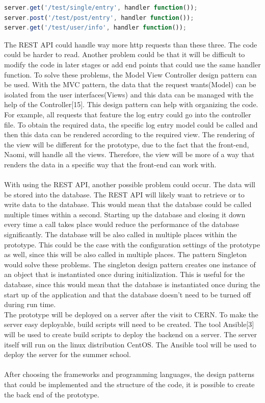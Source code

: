 \documentclass[paper=a4, fontsize=11pt,twoside]{scrartcl}	%
\begin{document}
\begin{lstlisting}[language=JavaScript, frame=single]
server.get('/test/single/entry', handler function());
server.post('/test/post/entry', handler function());
server.get('/test/user/info', handler function());
\end{lstlisting} 
The REST API could handle way more http requests than these three. The code could be harder to read. Another problem could be that it will be difficult to modify the code in later stages or add end points that could use the same handler function. To solve these problems, the Model View Controller design pattern can be used. With the MVC pattern, the data that the request wants(Model) can be isolated from the user interfaces(Views) and this data can be managed with the help of the Controller[15]. This design pattern can help with organizing the code. For example, all requests that feature the log entry could go into the controller file. To obtain the required data, the specific log entry model could be called and then this data can be rendered according to the required view. The rendering of the view will be different for the prototype, due to the fact that the front-end, Naomi, will handle all the views. Therefore, the view will be more of a way that renders the data in a specific way that the front-end can work with.\\ \\
With using the REST API, another possible problem could occur. The data will be stored into the database. The REST API will likely want to retrieve or to write data to the database. This would mean that the database could be called multiple times within a second. Starting up the database and closing it down every time a call takes place would reduce the performance of the database significantly. The database will be also called in multiple places within the prototype. This could be the case with the configuration settings of the prototype as well, since this will be also called in multiple places. The pattern Singleton would solve these problems. The singleton design pattern creates one instance of an object that is instantiated once during initialization. This is useful for the database, since this would mean that the database is instantiated once during the start up of the application and that the database doesn't need to be turned off during run time. \\ 
The prototype will be deployed on a server after the visit to CERN. To make the server easy deployable, build scripts will need to be created. The tool Ansible[3] will be used to create build scripts to deploy the backend on a server. The server itself will run on the linux distribution CentOS. The Ansible tool will be used to deploy the server for the summer school. \\ \\
After choosing the frameworks and programming languages, the design patterns that could be implemented and the structure of the code, it is possible to create the back end of the prototype.   
\end{document}
